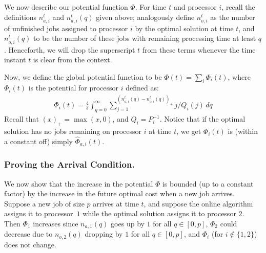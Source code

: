 \documentclass[11pt]{article}
\newcommand{\tsty}{}
\newcommand{\constun}{\frac{4}{\epsilon}}
\begin{document}
We now describe our potential function $\Phi$.  For time $t$ and
processor $i$, recall the definitions $n_{a,i}^{t}$ and $n_{a,i}^t(q)$ given above;
analogously define $n_{o,i}^{t}$ as the number of unfinished jobs assigned
to processor $i$ by the optimal solution at time $t$, and $n_{o,i}^{t}(q)$ to be the
number of these jobs with remaining processing time at least $q$.
Henceforth, we will drop the superscript $t$ from these terms whenever the time instant $t$ is clear from the context.

Now, we define the
global potential function to be $\Phi(t) = \sum_i \Phi_i(t)$, where
$\Phi_i(t)$ is the potential for processor $i$ defined as:
\begin{gather}
  \tsty \Phi_i(t) = \constun \int_{q=0}^{\infty} \sum_{j=1}^{(n_{a,i}^{t}(q) -
    n_{o,i}^{t}(q))_+} j/Q_i(j) \,dq \label{deq:pot-uf}
\end{gather}
 Recall that $(x)_+ = \max(x,0)$, and $Q_i = P_i^{-1}$.
Notice that if the optimal solution has no jobs remaining on processor $i$ at time
$t$, we get $\Phi_i(t)$ is (within a constant off) simply ${\widehat\Phi}_{a,i}(t)$.


\subsubsection{Proving the Arrival Condition.}

We now show that the increase in the potential $\Phi$ is bounded (up to
a constant factor) by the increase in the future optimal cost when a new
job arrives. Suppose a new job of size $p$ arrives at time $t$, and suppose
 the online algorithm assigns it
to processor~$1$ while the optimal solution assigns it to processor
$2$. Then $\Phi_1$ increases since $n_{a,1}(q)$ goes up by $1$ for all
$q \in [0,p]$, $\Phi_2$ could decrease due to $n_{o,2}(q)$ dropping by
$1$ for all $q \in [0,p]$, and $\Phi_i$ (for $i \notin \{1,2\}$) does
not change.
\end{document}
